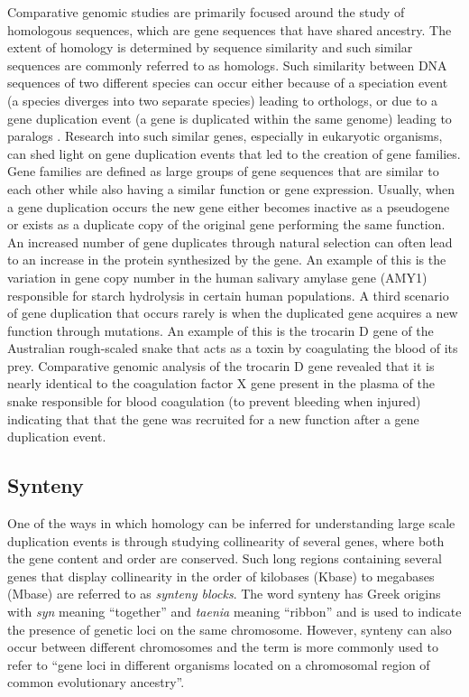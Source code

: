 Comparative genomic studies are primarily focused around the study of homologous sequences, which are gene sequences that have shared ancestry. The extent of homology is determined by sequence similarity and such similar sequences are commonly referred to as homologs. Such similarity between DNA sequences of two different species can occur either because of a speciation event (a species diverges into two separate species) leading to orthologs, or due to a gene duplication event (a gene is duplicated within the same genome) leading to paralogs \cite{jensen2001orthologs}. Research into such similar genes, especially in eukaryotic organisms, can shed light on gene duplication events that led to the creation of gene families\cite{rubin2000comparative}. Gene families are defined as large groups of gene sequences that are similar to each other while also having a similar function or gene expression. Usually, when a gene duplication occurs the new gene either becomes inactive as a pseudogene or exists as a duplicate copy of the original gene performing the same function. An increased number of gene duplicates through natural selection can often lead to an increase in the protein synthesized by the gene. An example of this is the variation in gene copy number in the human salivary amylase gene (AMY1) responsible for starch hydrolysis in certain human populations\cite{perry2007diet}. A third scenario of gene duplication that occurs rarely is when the duplicated gene acquires a new function through mutations. An example of this is the trocarin D gene of the Australian rough-scaled snake that acts as a toxin by coagulating the blood of its prey. Comparative genomic analysis of the trocarin D gene revealed that it is nearly identical to the coagulation factor X gene present in the plasma of the snake responsible for blood coagulation (to prevent bleeding when injured) indicating that that the gene was recruited for a new function after a gene duplication event\cite{reza2007structure}.

\subsection{Synteny}
One of the ways in which homology can be inferred for understanding large scale duplication events is through studying collinearity of several genes, where both the gene content and order are conserved\cite{proost2011adhore}. Such long regions containing several genes that display collinearity in the order of kilobases (Kbase) to megabases (Mbase) are referred to as \textit{synteny blocks}\cite{zeng2008orthocluster}. The word synteny has Greek origins with \textit{syn} meaning ``together'' and \textit{taenia} meaning ``ribbon'' and is used to indicate the presence of genetic loci on the same chromosome\cite{renwick1971mapping}. However, synteny can also occur between different chromosomes and the term is more commonly used to refer to ``gene loci in different organisms located on a chromosomal region of common evolutionary ancestry''\cite{passarge1999incorrect}.

